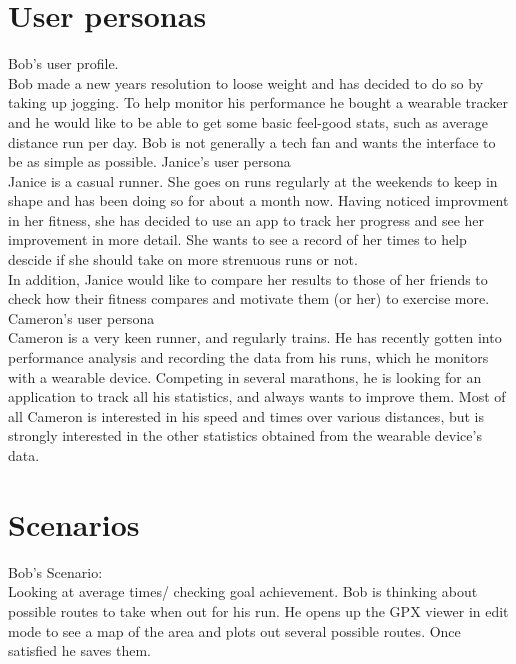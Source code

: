 \documentclass{article}
\begin{document}
\section{User personas}
\label{sec:personas}
Bob's user profile.\\
Bob made a new years resolution to loose weight and has decided to do so by taking up jogging. To help monitor his performance he bought a wearable tracker and he would like to be able to get some basic feel-good stats, such as average distance run per day. Bob is not generally a tech fan and wants the interface to be as simple as possible.
\vspace{5mm}
Janice's user persona\\
Janice is a casual runner. She goes on runs regularly at the weekends to keep in shape and has been doing so for about a month now. Having noticed improvment in her fitness, she has decided to use an app to track her progress and see her improvement in more detail. She wants to see a record of her times to help descide if she should take on more strenuous runs or not.\\
In addition, Janice would like to compare her results to those of her friends to check how their fitness compares and motivate them (or her) to exercise more.
\vspace{5mm}
Cameron's user persona\\
Cameron is a very keen runner, and regularly trains. He has recently gotten into performance analysis and recording the data from his runs, which he monitors with a wearable device. Competing in several marathons, he is looking for an application to track all his statistics, and always wants to improve them. Most of all Cameron is interested in his speed and times over various distances, but is strongly interested in the other statistics obtained from the wearable device's data.\\

\section{Scenarios}
\label{sec:scenario}
Bob's Scenario:\\
Looking at average times/ checking goal achievement.
Bob is thinking about possible routes to take when out for his run. He opens up the GPX viewer in edit mode to see a map of the area and plots out several possible routes. Once satisfied he saves them.
\end{document}
